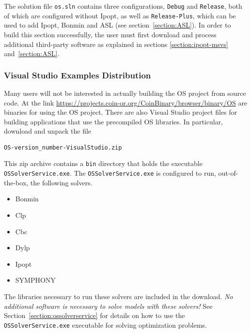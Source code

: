 \documentclass[11pt]{article}
\renewcommand{\_}{{\char"5F}}
\renewcommand{\{}{{\char"7B}}
\renewcommand{\}}{{\char"7D}}
\renewcommand{\^}{{\char"0D}}
\renewcommand{\'}{{\char"0D}}
\newif\ifipopt  \ipopttrue      %
\begin{document}
\ifipopt
The solution file {\tt os.sln} contains three configurations, {\tt Debug} and {\tt Release}, both of which are
configured without Ipopt, as well as {\tt Release-Plus}, which can be used to 
add Ipopt, Bonmin and ASL 
(see section~\ref{section:ASL}). In order to build this section successfully, 
the user must first download and process additional third-party software as explained in sections 
\ref{section:ipopt-msvs} and~\ref{section:ASL}.
\fi


\subsubsection{Visual Studio Examples Distribution}\label{section:vsexamples}

Many users will not be interested in actually building the OS project from source code.   At the link
\url{https://projects.coin-or.org/CoinBinary/browser/binary/OS} are  binaries for using the OS project.  
There are also Visual Studio project files for building applications that use the precompiled OS libraries.  
In particular, download and unpack the file

\begin{verbatim}
OS-version_number-VisualStudio.zip
\end{verbatim}

This zip archive contains a  {\tt bin} directory that holds  the executable  {\tt OSSolverService.exe}.   
The {\tt OSSolverService.exe} is configured to run, out-of-the-box,   the following solvers.

\begin{itemize}

\item Bonmin

\item Clp

\item Cbc

\item Dylp

\item Ipopt


\item  SYMPHONY

\end{itemize}
The libraries necessary to run these solvers are included in the download.  {\it No additional software is necessary 
to solve models with these solvers!}   See Section~\ref{section:ossolverservice} for details on how to use the 
{\tt OSSolverService.exe} executable for solving optimization problems. 
\end{document}
